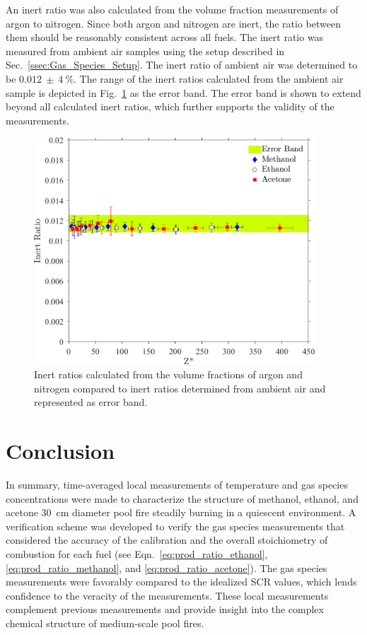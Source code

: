 \documentclass[12pt]{article}
\begin{document}
An inert ratio was also calculated from the volume fraction measurements of argon to nitrogen. Since both argon and nitrogen are inert, the ratio between them should be reasonably consistent across all fuels. The inert ratio was measured from ambient air samples using the setup described in Sec.~\ref{ssec:Gas_Species_Setup}. The inert ratio of ambient air was determined to be $0.012~\pm~4~\%$. The range of the inert ratios calculated from the ambient air sample is depicted in Fig.~\ref{fig:IR} as the error band. The error band is shown to extend beyond all calculated inert ratios, which further supports the validity of the measurements.
\begin{figure}[h!]
	\centering
\includegraphics[width=10.5cm, keepaspectratio]{Inert_ratio_Comparison.png}
	\caption[Stoichiometric Combustion Ratio calculated from experimental values compared to theoretical values]{Inert ratios calculated from the volume fractions of argon and nitrogen compared to inert ratios determined from ambient air and represented as error band.}
	\label{fig:IR}
\end{figure}


\section{Conclusion}
\label{sec:Conclusion}
In summary, time-averaged local measurements of temperature and gas species concentrations were made to characterize the structure of methanol, ethanol, and acetone \SI{30}{cm} diameter pool fire steadily burning in a quiescent environment. A verification scheme was developed to verify the gas species measurements that considered  the accuracy of the calibration and the overall stoichiometry of combustion for each fuel (see Eqn.~\ref{eq:prod_ratio_ethanol}, \ref{eq:prod_ratio_methanol}, and \ref{eq:prod_ratio_acetone}). The gas species measurements were favorably compared to the idealized SCR values, which lends confidence to the veracity of the measurements. These local measurements complement previous measurements and provide insight into the complex chemical structure of medium-scale pool fires.
\end{document}
